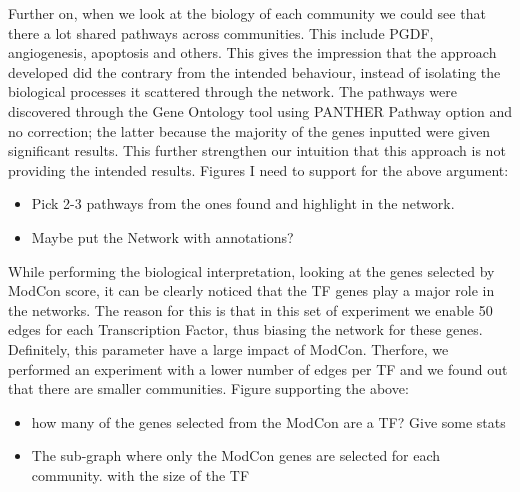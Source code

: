 Further on, when we look at the biology of each community we could see that there a lot shared pathways across communities. This include PGDF, angiogenesis, apoptosis and others. This gives the impression that the approach developed did the contrary from the intended behaviour, instead of isolating the biological processes it scattered through the network. The pathways were discovered through the Gene Ontology tool using PANTHER Pathway option and no correction; the latter because the majority of the genes inputted were given significant results. This further strengthen our intuition that this approach is not providing the intended results.
Figures I need to support for the above argument:
\begin{itemize}
    \item Pick 2-3 pathways from the ones found and highlight in the network.
    \item Maybe put the Network with annotations?
\end{itemize}

While performing the biological interpretation, looking at the genes selected by ModCon score, it can be clearly noticed that the TF genes play a major role in the networks. The reason for this is that in this set of experiment we enable 50 edges for each Transcription Factor, thus biasing the network for these genes. Definitely, this parameter have a large impact of ModCon. Therfore, we performed an experiment with a lower number of edges per TF and we found out that there are smaller communities.
Figure supporting the above:
\begin{itemize}
    \item how many of the genes selected from the ModCon are a TF? Give some stats
    \item The sub-graph where only the ModCon genes are selected for each community. with the size of the TF
\end{itemize}

